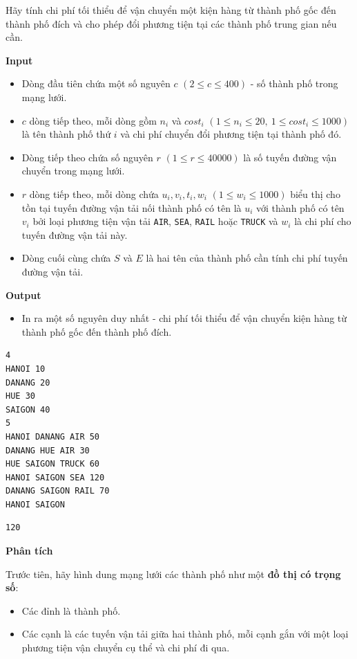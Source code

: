 \documentclass{article}
\begin{document}
Hãy tính chi phí tối thiểu để vận chuyển một kiện hàng từ thành phố gốc đến thành phố đích và cho phép đổi phương tiện tại các thành phố trung gian nếu cần.

\textbf{Input}

\begin{itemize}
    \item Dòng đầu tiên chứa một số nguyên $c$ $(2 \leq c \leq 400)$ - số thành phố trong mạng lưới.
    \item $c$ dòng tiếp theo, mỗi dòng gồm $n_i$ và $cost_i$ $(1 \leq n_i \leq 20,\ 1 \leq cost_i \leq 1000)$ là tên thành phố thứ $i$ và chi phí chuyển đổi phương tiện tại thành phố đó.
    \item Dòng tiếp theo chứa số nguyên $r$ $(1 \leq r \leq 40000)$ là số tuyến đường vận chuyển trong mạng lưới.
    \item $r$ dòng tiếp theo, mỗi dòng chứa $u_i, v_i, t_i, w_i$ $(1 \leq w_i \leq 1000)$ biểu thị cho tồn tại tuyến đường vận tải nối thành phố có tên là $u_i$ với thành phố có tên $v_i$ bởi loại phương tiện vận tải \texttt{AIR}, \texttt{SEA}, \texttt{RAIL} hoặc \texttt{TRUCK} và $w_i$ là chi phí cho tuyến đường vận tải này.
    \item Dòng cuối cùng chứa $S$ và $E$ là hai tên của thành phố cần tính chi phí tuyến đường vận tải.
\end{itemize}

\textbf{Output}
\begin{itemize}
    \item In ra một số nguyên duy nhất - chi phí tối thiểu để vận chuyển kiện hàng từ thành phố gốc đến thành phố đích.
\end{itemize}

\begin{lstlisting}[caption={Sample Input}]
4
HANOI 10
DANANG 20
HUE 30
SAIGON 40
5
HANOI DANANG AIR 50
DANANG HUE AIR 30
HUE SAIGON TRUCK 60
HANOI SAIGON SEA 120
DANANG SAIGON RAIL 70
HANOI SAIGON
\end{lstlisting}
\begin{lstlisting}[caption={Sample Output}]
120
\end{lstlisting}

\textbf{Phân tích}

Trước tiên, hãy hình dung mạng lưới các thành phố như một \textbf{đồ thị có trọng số}:
\begin{itemize}
    \item Các đỉnh là thành phố.
    \item Các cạnh là các tuyến vận tải giữa hai thành phố, mỗi cạnh gắn với một loại phương tiện vận chuyển cụ thể và chi phí đi qua.
\end{itemize}
\end{document}
